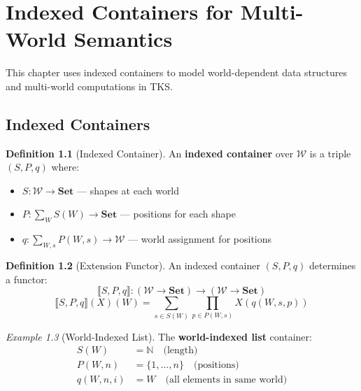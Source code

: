 \documentclass[11pt,twoside,openright]{book}
\theoremstyle{definition}
\newtheorem{definition}{Definition}[chapter]
\theoremstyle{plain}
\theoremstyle{remark}
\newtheorem{example}[definition]{Example}
\newcommand{\Worlds}{\mathcal{W}}
\newcommand{\vnewtwo}{\textbf{v7.2 New}}
\begin{document}

\chapter{Indexed Containers for Multi-World Semantics}
\label{ch:indexed-containers}

\begin{tcolorbox}[colback=blue!5!white,colframe=blue!75!black,title=\vnewtwo]
This chapter uses indexed containers to model world-dependent data structures and multi-world computations in TKS.
\end{tcolorbox}

\section{Indexed Containers}

\begin{definition}[Indexed Container]
\label{def:indexed-container}
An \textbf{indexed container} over $\Worlds$ is a triple $(S, P, q)$ where:
\begin{itemize}
  \item $S : \Worlds \to \mathbf{Set}$ --- shapes at each world
  \item $P : \sum_{W} S(W) \to \mathbf{Set}$ --- positions for each shape
  \item $q : \sum_{W,s} P(W, s) \to \Worlds$ --- world assignment for positions
\end{itemize}
\end{definition}

\begin{definition}[Extension Functor]
\label{def:extension}
An indexed container $(S, P, q)$ determines a functor:
\[
\llbracket S, P, q \rrbracket : (\Worlds \to \mathbf{Set}) \to (\Worlds \to \mathbf{Set})
\]
\[
\llbracket S, P, q \rrbracket(X)(W) = \sum_{s \in S(W)} \prod_{p \in P(W,s)} X(q(W, s, p))
\]
\end{definition}

\begin{example}[World-Indexed List]
\label{ex:world-list}
The \textbf{world-indexed list} container:
\begin{align}
S(W) &= \mathbb{N} \quad \text{(length)} \\
P(W, n) &= \{1, \ldots, n\} \quad \text{(positions)} \\
q(W, n, i) &= W \quad \text{(all elements in same world)}
\end{align}
\end{example}
\end{document}
